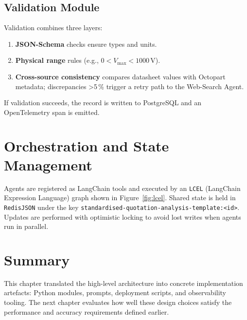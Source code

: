 \subsection{Validation Module}
Validation combines three layers:
\begin{enumerate}
  \item \textbf{JSON-Schema} checks ensure types and units.
  \item \textbf{Physical range} rules (e.g., $0< V_{\max}<1000\,\mathrm{V}$).
  \item \textbf{Cross-source consistency} compares datasheet values with Octopart metadata; discrepancies >5\,\% trigger a retry path to the Web-Search Agent.
\end{enumerate}
If validation succeeds, the record is written to PostgreSQL and an OpenTelemetry span is emitted.

\section{Orchestration and State Management}
Agents are registered as LangChain tools and executed by an \texttt{LCEL} (LangChain Expression Language) graph shown in Figure~\ref{fig:lcel}.  Shared state is held in \texttt{RedisJSON} under the key \texttt{standardised-quotation-analysis-template:\textless{}id\textgreater{}}.  Updates are performed with optimistic locking to avoid lost writes when agents run in parallel.

\section{Summary}
This chapter translated the high-level architecture into concrete implementation artefacts: Python modules, prompts, deployment scripts, and observability tooling.  The next chapter evaluates how well these design choices satisfy the performance and accuracy requirements defined earlier.